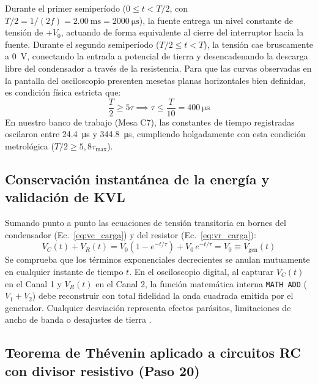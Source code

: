 Durante el primer semiperíodo ($0 \le t < T/2$, con $T/2 = 1/(2f) = \qty{2,00}{\milli\second} = \qty{2000}{\micro\second}$), la fuente entrega un nivel constante de tensión de $+V_0$, actuando de forma equivalente al cierre del interruptor hacia la fuente. Durante el segundo semiperíodo ($T/2 \le t < T$), la tensión cae bruscamente a \qty{0}{\volt}, conectando la entrada a potencial de tierra y desencadenando la descarga libre del condensador a través de la resistencia. Para que las curvas observadas en la pantalla del osciloscopio presenten mesetas planas horizontales bien definidas, es condición física estricta que:
\begin{equation}
    \frac{T}{2} \ge 5\tau \implies \tau \le \frac{T}{10} = \qty{400}{\micro\second}
    \label{eq:condicion_semiperiodo}
\end{equation}
En nuestro banco de trabajo (Mesa C7), las constantes de tiempo registradas oscilaron entre \qty{24,4}{\micro\second} y \qty{344,8}{\micro\second}, cumpliendo holgadamente con esta condición metrológica ($T/2 \ge 5{,}8\tau_{\max}$).

\subsection{Conservación instantánea de la energía y validación de KVL}

Sumando punto a punto las ecuaciones de tensión transitoria en bornes del condensador (Ec.~\eqref{eq:vc_carga}) y del resistor (Ec.~\eqref{eq:vr_carga}):
\begin{equation}
    V_C(t) + V_R(t) = V_0\left(1 - e^{-t/\tau}\right) + V_0\,e^{-t/\tau} = V_0 \equiv V_{\text{gen}}(t)
    \label{eq:kvl_suma_teorica}
\end{equation}
Se comprueba que los términos exponenciales decrecientes se anulan mutuamente en cualquier instante de tiempo $t$. En el osciloscopio digital, al capturar $V_C(t)$ en el Canal 1 y $V_R(t)$ en el Canal 2, la función matemática interna \texttt{MATH ADD} ($V_1 + V_2$) debe reconstruir con total fidelidad la onda cuadrada emitida por el generador. Cualquier desviación representa efectos parásitos, limitaciones de ancho de banda o desajustes de tierra \cite{hmo1202}.

\subsection{Teorema de Thévenin aplicado a circuitos RC con divisor resistivo (Paso 20)}

